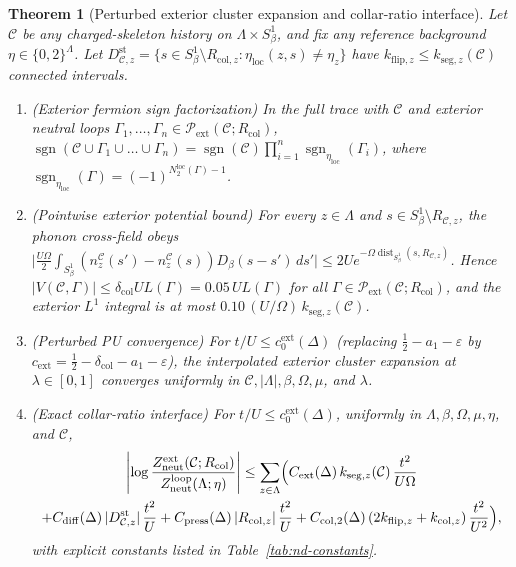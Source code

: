 \documentclass[11pt]{article}
\newtheorem{theorem}{Theorem}[section]
\theoremstyle{definition}
\theoremstyle{remark}
\DeclareMathOperator{\sgn}{sgn}
\begin{document}
\begin{theorem}[Perturbed exterior cluster expansion and collar-ratio interface]
\label{thm:nd-ext}
Let $\mathcal{C}$ be any charged-skeleton history on $\Lambda \times S^1_\beta$,
and fix any reference background $\eta \in \{0,2\}^\Lambda$. Let
$D_{\mathcal{C},z}^{\mathrm{st}} = \{s \in S^1_\beta \setminus R_{\mathrm{col},z} : \eta_{\mathrm{loc}}(z,s) \ne \eta_z\}$
have $k_{\mathrm{flip},z} \le k_{\mathrm{seg},z}(\mathcal{C})$ connected intervals.
\begin{enumerate}[leftmargin=1.5em]
\item \emph{(Exterior fermion sign factorization)} In the full trace with
$\mathcal{C}$ and exterior neutral loops $\Gamma_1,\dots,\Gamma_n \in \mathcal{P}_{\mathrm{ext}}(\mathcal{C}; R_{\mathrm{col}})$,
$\sgn(\mathcal{C} \cup \Gamma_1 \cup \dots \cup \Gamma_n) = \sgn(\mathcal{C})\prod_{i=1}^n \sgn_{\eta_{\mathrm{loc}}}(\Gamma_i)$,
where $\sgn_{\eta_{\mathrm{loc}}}(\Gamma) = (-1)^{N_2^{\mathrm{loc}}(\Gamma)-1}$.
\item \emph{(Pointwise exterior potential bound)} For every $z \in \Lambda$ and
$s \in S^1_\beta \setminus R_{\mathcal{C},z}$, the phonon cross-field obeys
$\bigl|\frac{U\Omega}{2}\int_{S^1_\beta}(n_z^{\mathcal{C}}(s') - n_z^{\mathcal{C}}(s)) D_\beta(s-s')\,ds'\bigr| \le 2U e^{-\Omega\operatorname{dist}_{S^1_\beta}(s, R_{\mathcal{C},z})}$.
Hence $|V(\mathcal{C},\Gamma)| \le \delta_{\mathrm{col}} U L(\Gamma) = 0.05\, U L(\Gamma)$
for all $\Gamma \in \mathcal{P}_{\mathrm{ext}}(\mathcal{C}; R_{\mathrm{col}})$, and
the exterior $L^1$ integral is at most $0.10\,(U/\Omega)\,k_{\mathrm{seg},z}(\mathcal{C})$.
\item \emph{(Perturbed PU convergence)} For $t/U \le c_0^{\mathrm{ext}}(\Delta)$
(replacing $\frac{1}{2}-a_1-\varepsilon$ by $c_{\mathrm{ext}} = \frac{1}{2}-\delta_{\mathrm{col}}-a_1-\varepsilon$),
the interpolated exterior cluster expansion at $\lambda \in [0,1]$ converges
uniformly in $\mathcal{C}, |\Lambda|, \beta, \Omega, \mu$, and $\lambda$.
\item \emph{(Exact collar-ratio interface)} For $t/U \le c_0^{\mathrm{ext}}(\Delta)$,
uniformly in $\Lambda, \beta, \Omega, \mu, \eta$, and $\mathcal{C}$,
\begin{multline*}
\left|\log \frac{Z_{\mathrm{neut}}^{\mathrm{ext}}(\mathcal{C}; R_{\mathrm{col}})}{Z_{\mathrm{neut}}^{\mathrm{loop}}(\Lambda; \eta)}\right|
\le \sum_{z \in \Lambda} \Bigl(
C_{\mathrm{ext}}(\Delta)\, k_{\mathrm{seg},z}(\mathcal{C})\,\frac{t^2}{U\Omega} \\
+ C_{\mathrm{diff}}(\Delta)\, |D_{\mathcal{C},z}^{\mathrm{st}}|\,\frac{t^2}{U}
+ C_{\mathrm{press}}(\Delta)\, |R_{\mathrm{col},z}|\,\frac{t^2}{U}
+ C_{\mathrm{col},2}(\Delta)\, (2 k_{\mathrm{flip},z} + k_{\mathrm{col},z})\,\frac{t^2}{U^2}
\Bigr),
\end{multline*}
with explicit constants listed in Table~\ref{tab:nd-constants}.
\end{enumerate}
\end{theorem}
\end{document}
